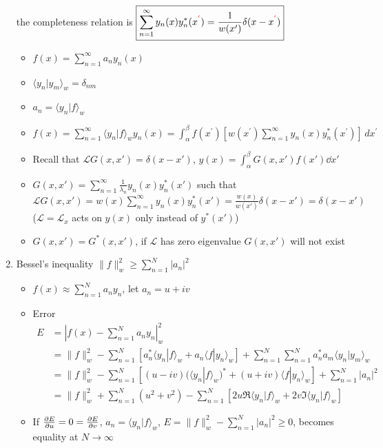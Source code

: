 \documentclass{article}
\theoremstyle{remark}
\theoremstyle{remark}
\begin{document}
\begin{enumerate}
        the completeness relation is $\boxed{\sum_{n=1}^{\infty}y_{n}(x)y_{n}^{*}(x^{\color{red}{'}})={\frac{1}{w(x^{\prime})}}\delta(x-x^{\color{red}{'}})}$
        \begin{itemize}
            \item $f(x)=\sum_{n=1}^{\infty}a_n y_n(x)$
            \item $\langle y_n|y_m\rangle_w = \delta_{nm}$
            \item $a_n = \langle y_n|f\rangle_w$
            \item $f(x)=\sum_{n=1}^{\infty}\langle y_n|f\rangle_w y_n(x) = \int_{\alpha}^{\beta}f(x^{\prime})\left[w(x^{\prime})\sum_{n=1}^{\infty}y_{n}(x)y_{n}^{*}(x^{\prime})\right]\,d x^{\prime}$
            \item Recall that $\mathcal{L}G(x,x')=\delta(x-x')$, $y(x)=\int_\alpha^\beta G(x,x')f(x')\dd x'$
            \item $\boxed{G(x,x')=\sum_{n=1}^{\infty}\frac{1}{\lambda_n}y_n(x)y_n^*(x')}$ such that $\mathcal{L}G(x,x')=w(x)\sum_{n=1}^{\infty}y_n(x)y^*_n(x')=\frac{w(x)}{w(x')}\delta(x-x')=\delta(x-x')$ ($\mathcal{L}=\mathcal{L}_x$ acts on $y(x)$ only instead of $y^*(x')$)
            \item $G(x,x')=G^*(x,x')$, if $\mathcal{L}$ has zero eigenvalue $G(x,x')$ will not exist
        \end{itemize}
        \item Bessel's inequality $\|f\|^2_w\geq\sum_{n=1}^{N}|a_n|^2$\begin{itemize}
            \item $f(x)\approx\sum_{n=1}^{N}a_ny_n$, let $a_n=u+iv$
            \item Error 
            \begin{align*}
                E &= \left|f(x)-\sum_{n=1}^{N}a_ny_n\right|^2_w\\
                  &= \|f\|^2_w-\sum_{n=1}^{N}[a^*_n\langle y_n|f\rangle_w+a_n\langle f|y_n\rangle_w] + \sum_{n=1}^{N}\sum_{n=1}^{N}a^*_n a_m\langle y_n|y_m\rangle_w \\
                  &= \|f\|^2_w-\sum_{n=1}^{N}[(u-iv)(\langle y_n|f\rangle_w)^* + (u+iv)\langle f|y_n\rangle_w] + \sum_{n=1}^{N}|a_n|^2 \\
                  &= \|f\|^2_w + \sum_{n=1}^{N}(u^2+v^2) - \sum_{n=1}^{N}[2u\Re{\langle y_n|f\rangle_w}+2v\Im{\langle y_n|f\rangle_w}]
            \end{align*}
            \item If $\pdv{E}{u} = 0 = \pdv{E}{v}$, $a_n=\langle y_n|f\rangle_w$, $E = \|f\|^2_w - \sum_{n=1}^{N}|a_n|^2 \geq 0$, becomes equality at $N\rightarrow\infty$
        \end{itemize}
    \end{enumerate}
\end{document}
